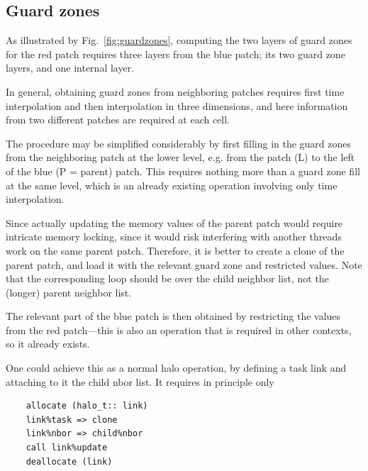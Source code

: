 \documentclass[paper=a4,fontsize=11pt]{scrartcl}
\numberwithin{equation}{section}		%
\numberwithin{figure}{section}			%
\numberwithin{table}{section}				%
\newcommand{\codecolor}{\color{Blue}}
\newcommand{\Fig}[1]{Fig.\ \ref{fig:#1}}
\begin{document}
\subsection{Guard zones}
As illustrated by \Fig{guardzones}, computing the two layers of guard zones for the red patch requires three layers from the blue patch; its two guard zone layers, and one internal layer.

In general, obtaining guard zones from neighboring patches requires first time interpolation and then interpolation in three dimensions, and here information from two different patches are required at each cell.

The procedure may be simplified considerably by first filling in the guard zones from the neighboring patch at the lower level, e.g. from the patch (L) to the left of the blue (P = parent) patch.  This requires nothing more than a guard zone fill at the same level, which is an already existing operation involving only time interpolation.

Since actually updating the memory values of the parent patch would require intricate memory locking, since it would risk interfering with another threads work on the same parent patch.  Therefore, it is better to create a clone of the parent patch, and load it with the relevant guard zone and restricted values.  Note that the corresponding loop should be over the child neighbor list, not the (longer) parent neighbor list.  

The relevant part of the blue patch is then obtained by restricting the values from the red patch---this is also an operation that is required in other contexts, so it already exists.

One could achieve this as a normal halo operation, by defining a task link and attaching to it the child nbor list.  It requires in principle only
{\codecolor
\begin{verbatim}
    allocate (halo_t:: link)
    link%task => clone
    link%nbor => child%nbor
    call link%update
    deallocate (link)
\end{verbatim}}
\end{document}
